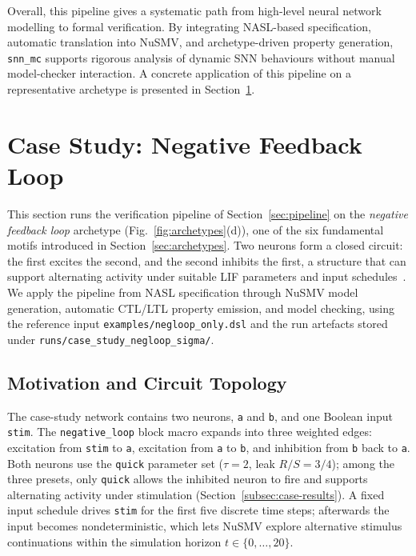 \documentclass[
]{ceurart}
\begin{document}
Overall, this pipeline gives a systematic path from high-level neural
network modelling to formal verification. By integrating
\textsc{NASL}-based specification, automatic translation into NuSMV, and
archetype-driven property generation, \texttt{snn\_mc} supports rigorous
analysis of dynamic SNN behaviours without manual model-checker
interaction. A concrete application of this pipeline on a representative
archetype is presented in Section~\ref{sec:case-study}.

\section{Case Study: Negative Feedback Loop}
\label{sec:case-study}

This section runs the verification pipeline of Section~\ref{sec:pipeline}
on the \emph{negative feedback loop} archetype (Fig.~\ref{fig:archetypes}(d)),
one of the six fundamental motifs introduced in
Section~\ref{sec:archetypes}. Two neurons form a closed circuit: the first
excites the second, and the second inhibits the first, a structure that
can support alternating activity under suitable LIF parameters and input
schedules~\cite{DeMaria2020}. We apply the pipeline from \textsc{NASL}
specification through NuSMV model generation, automatic CTL/LTL property
emission, and model checking, using the reference input
\texttt{examples/negloop\_only.dsl} and the run artefacts stored under
\texttt{runs/case\_study\_negloop\_sigma/}.

\subsection{Motivation and Circuit Topology}

The case-study network contains two neurons, \texttt{a} and \texttt{b},
and one Boolean input \texttt{stim}. The \texttt{negative\_loop} block
macro expands into three weighted edges: excitation from \texttt{stim} to
\texttt{a}, excitation from \texttt{a} to \texttt{b}, and inhibition from
\texttt{b} back to \texttt{a}. Both neurons use the \texttt{quick}
parameter set ($\tau = 2$, leak $R/S = 3/4$); among the three presets,
only \texttt{quick} allows the inhibited neuron to fire and supports
alternating activity under stimulation (Section~\ref{subsec:case-results}). A fixed input schedule drives
\texttt{stim} for the first five discrete time steps; afterwards the input
becomes nondeterministic, which lets NuSMV explore alternative stimulus
continuations within the simulation horizon $t \in \{0,\ldots,20\}$.
\end{document}

